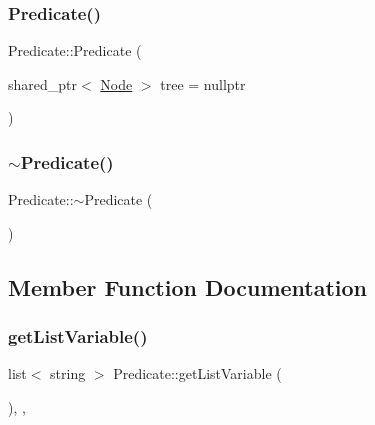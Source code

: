 \subsubsection{\texorpdfstring{Predicate()}{Predicate()}\hspace{0.1cm}{\footnotesize\ttfamily [2/2]}}
{\footnotesize\ttfamily Predicate\+::\+Predicate (\begin{DoxyParamCaption}\item[{shared\+\_\+ptr$<$ \hyperlink{class_node}{Node} $>$}]{tree = {\ttfamily nullptr} }\end{DoxyParamCaption})}

\mbox{\label{class_predicate_a0ba364e4092dee9b9c43e0c447f36de3}} 
\subsubsection{\texorpdfstring{$\sim$\+Predicate()}{~Predicate()}}
{\footnotesize\ttfamily Predicate\+::$\sim$\+Predicate (\begin{DoxyParamCaption}{ }\end{DoxyParamCaption})\hspace{0.3cm}{\ttfamily [override]}}



\subsection{Member Function Documentation}
\mbox{\label{class_predicate_ae2524ae4cd1e71a00984f6a49d717469}} 
\subsubsection{\texorpdfstring{get\+List\+Variable()}{getListVariable()}}
{\footnotesize\ttfamily list$<$ string $>$ Predicate\+::get\+List\+Variable (\begin{DoxyParamCaption}{ }\end{DoxyParamCaption})\hspace{0.3cm}{\ttfamily [override]}, {\ttfamily [private]}, {\ttfamily [virtual]}}



